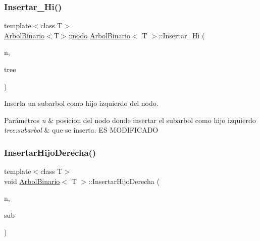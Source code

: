 \subsubsection{\texorpdfstring{Insertar\+\_\+\+Hi()}{Insertar\_Hi()}\hspace{0.1cm}{\footnotesize\ttfamily [2/2]}}
{\footnotesize\ttfamily template$<$class T$>$ \\
\hyperlink{classArbolBinario}{Arbol\+Binario}$<$T$>$\+::\hyperlink{classArbolBinario_1_1nodo}{nodo} \hyperlink{classArbolBinario}{Arbol\+Binario}$<$ T $>$\+::Insertar\+\_\+\+Hi (\begin{DoxyParamCaption}\item[{typename \hyperlink{classArbolBinario}{Arbol\+Binario}$<$ T $>$\+::\hyperlink{classArbolBinario_1_1nodo}{nodo}}]{n,  }\item[{\hyperlink{classArbolBinario}{Arbol\+Binario}$<$ T $>$ \&}]{tree }\end{DoxyParamCaption})}



Inserta un subarbol como hijo izquierdo del nodo. 


\begin{DoxyParams}{Parámetros}
{\em n} & posicion del nodo donde insertar el subarbol como hijo izquierdo \\
\hline
{\em tree\+:subarbol} & que se inserta. ES M\+O\+D\+I\+F\+I\+C\+A\+DO \\
\hline
\end{DoxyParams}
\mbox{\label{classArbolBinario_a8f4971f20eb2a059b9b1ae117e7fe912}} 
\subsubsection{\texorpdfstring{Insertar\+Hijo\+Derecha()}{InsertarHijoDerecha()}\hspace{0.1cm}{\footnotesize\ttfamily [1/2]}}
{\footnotesize\ttfamily template$<$class T$>$ \\
void \hyperlink{classArbolBinario}{Arbol\+Binario}$<$ T $>$\+::Insertar\+Hijo\+Derecha (\begin{DoxyParamCaption}\item[{\hyperlink{structArbolBinario_1_1info__nodo}{info\+\_\+nodo} $\ast$}]{n,  }\item[{\hyperlink{structArbolBinario_1_1info__nodo}{info\+\_\+nodo} $\ast$}]{sub }\end{DoxyParamCaption})\hspace{0.3cm}{\ttfamily [private]}}




